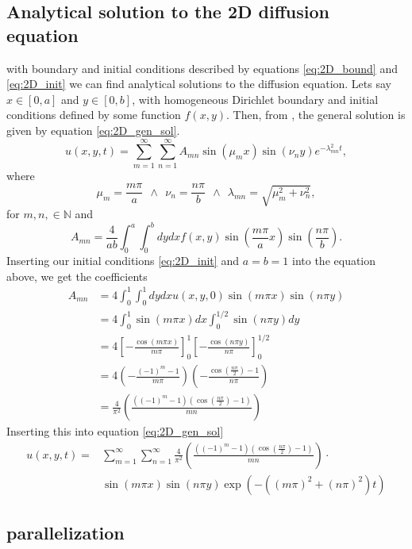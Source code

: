 \documentclass[reprint, english,notitlepage,nofootinbib]{revtex4-1}  %
\begin{document}
\subsection*{Analytical solution to the 2D diffusion equation}
with boundary and initial conditions described by equations \eqref{eq:2D_bound} and \eqref{eq:2D_init} we can find analytical solutions to the diffusion equation. Lets say $x\in[0,a]$ and $y\in[0,b]$, with homogeneous Dirichlet boundary and initial conditions defined by some function $f(x,y)$. Then, from \cite{2D_diffusion}, the general solution is given by equation \eqref{eq:2D_gen_sol}.
\begin{equation}
	\label{eq:2D_gen_sol}
	u(x,y,t) = \sum_{m=1}^{\infty}\sum_{n=1}^{\infty}A_{mn}\sin(\mu_m x)\sin(\nu_n y)e^{-\lambda^2_{mn}t},
\end{equation}
where
\begin{equation*}
	\mu_m = \frac{m\pi}{a} \ \ \wedge \ \ \nu_n=\frac{n\pi}{b} \ \ \wedge \ \ \lambda_{mn} = \sqrt{\mu_m^2 + \nu_n^2},
\end{equation*}
for $m,n,\in\mathbb{N}$ and
\begin{equation*}
	A_{mn} = \frac{4}{ab}\int_{0}^{a}\int_{0}^{b}dydxf(x,y)\sin(\frac{m\pi}{a}x)\sin(\frac{n\pi}{b}).
\end{equation*}
Inserting our initial conditions \eqref{eq:2D_init} and $a=b=1$ into the equation above, we get the coefficients
\begin{align*}
	A_{mn} &= 4\int_{0}^{1}\int_{0}^{1}dydxu(x,y,0)\sin(m\pi x)\sin(n\pi y) \\
	&= 4\int_{0}^{1}\sin(m\pi x)dx \int_{0}^{1/2}\sin(n\pi y)dy \\
	&= 4\left[-\frac{\cos(m\pi x)}{m\pi}\right]_0^1\left[-\frac{\cos(n\pi y)}{n\pi}\right]_0^{1/2} \\
	&= 4\left(-\frac{(-1)^{m} - 1}{m\pi}\right)\left(-\frac{\cos(\frac{n\pi}{2}) - 1}{n\pi}\right) \\
	&= \frac{4}{\pi^2}\left(\frac{\left((-1)^m - 1\right)\left(\cos(\frac{n\pi}{2}) - 1\right)}{mn}\right)
\end{align*}
Inserting this into equation \eqref{eq:2D_gen_sol}
\begin{align*}
	u(x,y,t) =& \sum_{m=1}^{\infty}\sum_{n=1}^{\infty}\frac{4}{\pi^2}\left(\frac{\left((-1)^m - 1\right)\left(\cos(\frac{n\pi}{2}) - 1\right)}{mn}\right)\cdot\\
	&\sin(m\pi x)\sin(n\pi y)\exp(-((m\pi)^2 + (n\pi)^2)t)
\end{align*}
\subsection*{parallelization}
\end{document}
